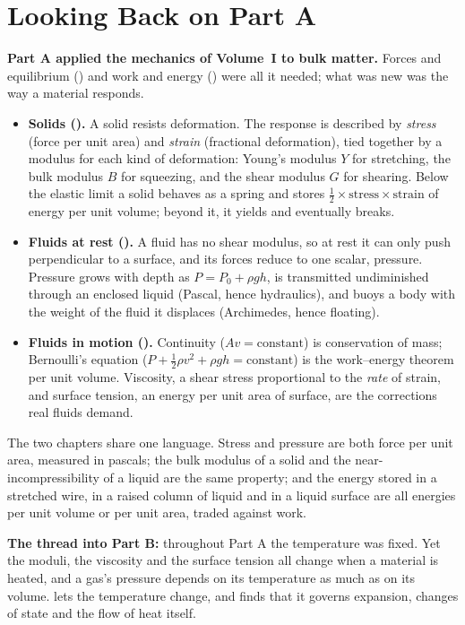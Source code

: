 \section*{Looking Back on Part A}

\textbf{Part A applied the mechanics of Volume~I to bulk matter.} Forces and equilibrium
() and work and energy () were all it needed; what was new was the way a
material responds.
\begin{itemize}
\item \textbf{Solids ().} A solid resists deformation. The response is described by
\emph{stress} (force per unit area) and \emph{strain} (fractional deformation), tied together by a modulus
for each kind of deformation: Young's modulus $Y$ for stretching, the bulk modulus $B$ for squeezing, and the
shear modulus $G$ for shearing. Below the elastic limit a solid behaves as a spring and stores
$\tfrac12\times\text{stress}\times\text{strain}$ of energy per unit volume; beyond it, it yields and
eventually breaks.
\item \textbf{Fluids at rest ().} A fluid has no shear modulus, so at rest it can only push
perpendicular to a surface, and its forces reduce to one scalar, pressure. Pressure grows with depth as
$P=P_0+\rho gh$, is transmitted undiminished through an enclosed liquid (Pascal, hence hydraulics), and
buoys a body with the weight of the fluid it displaces (Archimedes, hence floating).
\item \textbf{Fluids in motion ().} Continuity ($Av=\text{constant}$) is conservation of
mass; Bernoulli's equation ($P+\tfrac12\rho v^2+\rho gh=\text{constant}$) is the work--energy theorem per unit
volume. Viscosity, a shear stress proportional to the \emph{rate} of strain, and surface tension, an energy
per unit area of surface, are the corrections real fluids demand.
\end{itemize}
The two chapters share one language. Stress and pressure are both force per unit area, measured in pascals;
the bulk modulus of a solid and the near-incompressibility of a liquid are the same property; and the
energy stored in a stretched wire, in a raised column of liquid and in a liquid surface are all energies
per unit volume or per unit area, traded against work.

\textbf{The thread into Part B:} throughout Part A the temperature was fixed. Yet the moduli, the viscosity
and the surface tension all change when a material is heated, and a gas's pressure depends on its
temperature as much as on its volume.  lets the temperature change, and finds that it
governs expansion, changes of state and the flow of heat itself.
